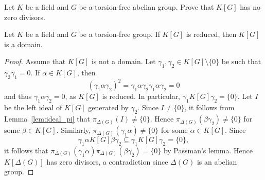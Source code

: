 \begin{exercise}
    Let $K$ be a field and $G$ be a torsion-free abelian group. Prove that 
    $K[G]$ has no zero divisors. 
\end{exercise}


\begin{theorem}[Passman]
\label{thm:Passman}
	Let $K$ be a field and $G$ be a torsion-free group. If 
	$K[G]$ is reduced, then $K[G]$ is a domain.
\end{theorem}

\begin{proof}
	Assume that $K[G]$ is not a domain. Let $\gamma_1,\gamma_2\in K[G]\setminus\{0\}$
	be such that $\gamma_2\gamma_1=0$. If $\alpha\in K[G]$, then
	\[
		(\gamma_1\alpha\gamma_2)^2=\gamma_1\alpha\gamma_2\gamma_1\alpha\gamma_2=0
	\]
	and thus $\gamma_1\alpha\gamma_2=0$, as $K[G]$ is reduced. In particular, 
	$\gamma_1K[G]\gamma_2=\{0\}$. Let $I$ be the left ideal of $K[G]$ generated 
	by $\gamma_2$. Since $I\ne\{0\}$, it follows
	from Lemma~\ref{lem:ideal_pi} that 
	$\pi_{\Delta(G)}(I)\ne\{0\}$. Hence 
	$\pi_{\Delta(G)}(\beta\gamma_2)\ne\{ 0\}$ for some $\beta\in K[G]$. 
	Similarly, 
	$\pi_{\Delta(G)}(\gamma_1\alpha)\ne\{ 0\}$ for some $\alpha\in K[G]$. Since 
	\[
		\gamma_1\alpha K[G]\beta\gamma_2\subseteq \gamma_1 K[G]\gamma_2=\{0\},
	\]
    it follows that $\pi_{\Delta(G)}(\gamma_1\alpha)\pi_{\Delta(G)}(\beta\gamma_2)=\{0\}$
    by Passman's lemma. Hence $K[\Delta(G)]$ has zero divisors, a contradiction
    since $\Delta(G)$ is an abelian group.
\end{proof}



